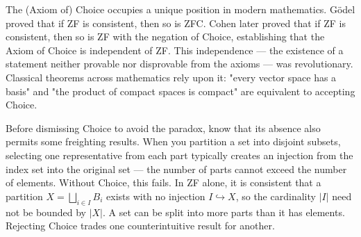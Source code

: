 The (Axiom of) Choice occupies a unique position in modern mathematics. Gödel proved that if ZF is consistent, then so is ZFC. Cohen later proved that if ZF is consistent, then so is ZF with the negation of Choice, establishing that the Axiom of Choice is independent of ZF. This independence — the existence of a statement neither provable nor disprovable from the axioms — was revolutionary. Classical theorems across mathematics rely upon it: "every vector space has a basis" and "the product of compact spaces is compact" are equivalent to accepting Choice. 

Before dismissing Choice to avoid the paradox, know that its absence also permits some freighting results. When you partition a set into disjoint subsets, selecting one representative from each part typically creates an injection from the index set into the original set — the number of parts cannot exceed the number of elements. Without Choice, this fails. In ZF alone, it is consistent that a partition $X = \bigsqcup_{i \in I} B_i$ exists with no injection $I \hookrightarrow X$, so the cardinality $|I|$ need not be bounded by $|X|$. A set can be split into more parts than it has elements. Rejecting Choice trades one counterintuitive result for another. 

